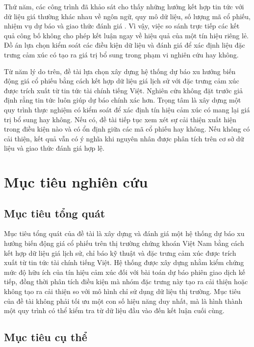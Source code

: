 Thứ năm, các công trình đã khảo sát cho thấy những hướng kết hợp tin tức với dữ liệu
giá thường khác nhau về ngôn ngữ, quy mô dữ liệu, số lượng mã cổ phiếu, nhiệm vụ dự báo
và giao thức đánh giá \cite{Halder2022_221107392v1,Gu2024_240716150v1,
Chen2021_210708721v1,Omranpour2024_241210540v1}. Vì vậy, việc so sánh trực tiếp các
kết quả công bố không cho phép kết luận ngay về hiệu quả của một tín hiệu riêng lẻ.
Đồ án lựa chọn kiểm soát các điều kiện dữ liệu và đánh giá để xác định liệu đặc trưng
cảm xúc có tạo ra giá trị bổ sung trong phạm vi nghiên cứu hay không.

Từ năm lý do trên, đề tài lựa chọn xây dựng hệ thống dự báo xu hướng biến động giá cổ
phiếu bằng cách kết hợp dữ liệu giá lịch sử với đặc trưng cảm xúc được trích xuất từ
tin tức tài chính tiếng Việt. Nghiên cứu không đặt trước giả định rằng tin tức luôn giúp
dự báo chính xác hơn. Trọng tâm là xây dựng một quy trình thực nghiệm có kiểm soát để
xác định tín hiệu cảm xúc có mang lại giá trị bổ sung hay không. Nếu có, đề tài tiếp
tục xem xét sự cải thiện xuất hiện trong điều kiện nào và có ổn định giữa các mã cổ
phiếu hay không. Nếu không có cải thiện, kết quả vẫn có ý nghĩa khi nguyên nhân được
phân tích trên cơ sở dữ liệu và giao thức đánh giá hợp lệ.


\section{Mục tiêu nghiên cứu}
\label{sec:muc-tieu}

\subsection{Mục tiêu tổng quát}

Mục tiêu tổng quát của đề tài là xây dựng và đánh giá một hệ thống dự báo xu hướng biến
động giá cổ phiếu trên thị trường chứng khoán Việt Nam bằng cách kết hợp dữ liệu giá
lịch sử, chỉ báo kỹ thuật và đặc trưng cảm xúc được trích xuất từ tin tức tài chính
tiếng Việt. Hệ thống được xây dựng nhằm kiểm chứng mức độ hữu ích của tín hiệu cảm xúc
đối với bài toán dự báo phiên giao dịch kế tiếp, đồng thời phân tích điều kiện mà nhóm
đặc trưng này tạo ra cải thiện hoặc không tạo ra cải thiện so với mô hình chỉ sử dụng
dữ liệu thị trường. Mục tiêu của đề tài không phải tối ưu một con số hiệu năng duy nhất,
mà là hình thành một quy trình có thể kiểm tra từ dữ liệu đầu vào đến kết luận cuối cùng.

\subsection{Mục tiêu cụ thể}

